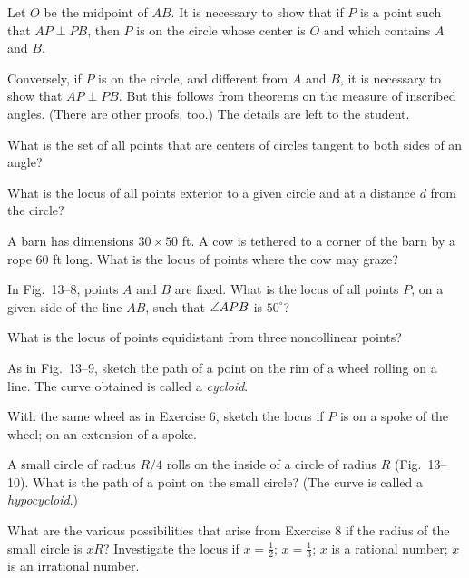 \documentclass[11pt]{book}
\begin{document}
\FIGXIIISEVEN

Let $O$ be the midpoint of $AB$. It is necessary to show that if $P$ is a point
such that $AP \perp PB$, then $P$ is on the circle whose center is $O$ and which
contains $A$ and $B$.

Conversely, if $P$ is on the circle, and different from $A$ and $B$, it is
necessary to show that $AP \perp PB$. But this follows from theorems on the
measure of inscribed angles. (There are other proofs, too.) The details are left
to the student.


\begin{exercisecols}
\begin{exlist}
\item What is the set of all points that are centers of circles tangent to both
      sides of an angle?
\item What is the locus of all points exterior to a given circle and at a
      distance $d$ from the circle?
\item A barn has dimensions $30 \times 50$ ft. A cow is tethered to a corner of
      the barn by a rope 60 ft long. What is the locus of points where the cow
      may graze?
\item[\stex 4.] In Fig.~13--8, points $A$ and $B$ are fixed. What is the locus
      of all points $P$, on a given side of the line $AB$, such that
      $\angle APB$ is $50^\circ$?
\exfig{\FIGXIIIEIGHT}
\item[5.] What is the locus of points equidistant from three noncollinear
      points?
\item[6.] As in Fig.~13--9, sketch the path of a point on the rim of a wheel
      rolling on a line. The curve obtained is called a \emph{cycloid}.
\exfig{\FIGXIIININE}
\item[\stex 7.] With the same wheel as in Exercise 6, sketch the locus if $P$ is
      on a spoke of the wheel; on an extension of a spoke.
\item[8.] A small circle of radius $R/4$ rolls on the inside of a circle of
      radius $R$ (Fig.~13--10). What is the path of a point on the small circle?
      (The curve is called a \emph{hypocycloid}.)
\exfig{\FIGXIIITEN}
\item[\stex 9.] What are the various possibilities that arise from Exercise 8 if
      the radius of the small circle is $xR$? Investigate the locus if
      $x = \frac{1}{2}$; $x = \frac{1}{3}$; $x$ is a rational number; $x$ is an
      irrational number.
\end{exlist}
\end{exercisecols}
\end{document}
